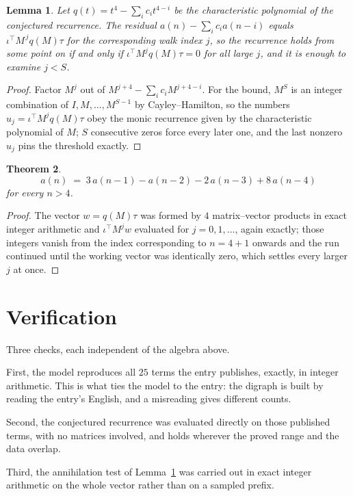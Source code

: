 \documentclass[11pt,a4paper]{article}
\theoremstyle{plain}
\newtheorem{theorem}{Theorem}
\newtheorem{lemma}[theorem]{Lemma}
\theoremstyle{definition}
\begin{document}
\begin{lemma}\label{lem:crit}
Let $q(t)=t^{4}-\sum_i c_it^{4-i}$ be the characteristic polynomial of the
conjectured recurrence. The residual $a(n)-\sum_ic_ia(n-i)$ equals
$\iota^{\!\top}M^{\,j}q(M)\tau$ for the corresponding walk index $j$, so the recurrence
holds from some point on if and only if $\iota^{\!\top}M^{j}q(M)\tau=0$ for all large $j$,
and it is enough to examine $j<S$.
\end{lemma}

\begin{proof}
Factor $M^{j}$ out of $M^{j+4}-\sum_ic_iM^{j+4-i}$. For the bound, $M^{S}$
is an integer combination of $I,M,\dots,M^{S-1}$ by Cayley--Hamilton, so the numbers
$u_j=\iota^{\!\top}M^{j}q(M)\tau$ obey the monic recurrence given by the characteristic
polynomial of $M$; $S$ consecutive zeros force every later one, and the last nonzero $u_j$
pins the threshold exactly.
\end{proof}

\begin{theorem}
\[
a(n)\;=\;3\,a(n-1) - a(n-2) - 2\,a(n-3) + 8\,a(n-4)
\]
for every $n>4$.
\end{theorem}

\begin{proof}
The vector $w=q(M)\tau$ was formed by $4$ matrix--vector products in exact integer
arithmetic and $\iota^{\!\top}M^{j}w$ evaluated for $j=0,1,\dots$, again exactly; those
integers vanish from the index corresponding to $n=4+1$ onwards and the run continued
until the working vector was identically zero, which settles every larger $j$ at once.
\end{proof}

\section{Verification}

Three checks, each independent of the algebra above.

First, the model reproduces all $25$ terms the entry publishes, exactly, in integer
arithmetic. This is what ties the model to the entry: the digraph is built by reading the
entry's English, and a misreading gives different counts.

Second, the conjectured recurrence was evaluated directly on those published terms, with no
matrices involved, and holds wherever the proved range and the data overlap.

Third, the annihilation test of Lemma~\ref{lem:crit} was carried out in exact integer
arithmetic on the whole vector rather than on a sampled prefix.
\end{document}
